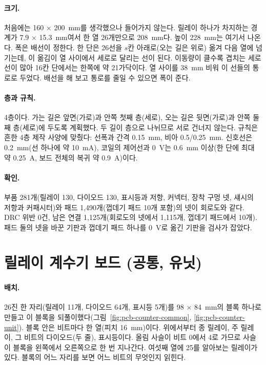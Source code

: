 \paragraph{크기.} 처음에는 160 × 200~mm를 생각했으나 들어가지 않는다. 릴레이 하나가 차지하는 경계가
7.9 × 15.3~mm여서 한 열 26개만으로 208~mm다. 높이 228~mm는 여기서 나온다. 폭은 배선이 정한다. 한 단은 26선을
$s$칸 아래로(오는 길은 위로) 옮겨 다음 열에 넘기는데, 이 옮김이 열 사이에서 세로로 달리는 선이 된다. 이동량이
클수록 겹치는 세로 선이 많아 16칸 단에서는 한쪽에 약 21가닥이다. 열 사이를 38~mm 비워 이 선들의 통로로 두었다.
배선을 해 보고 통로를 줄일 수 있으면 폭이 준다.

\paragraph{층과 규칙.} 4층이다. 가는 길은 앞면(가로)과 안쪽 첫째 층(세로), 오는 길은 뒷면(가로)과 안쪽 둘째
층(세로)에 두도록 계획했다. 두 길이 층으로 나뉘므로 서로 건너지 않는다. 규칙은 흔한 4층 제작 사양에
맞췄다: 선폭과 간격 0.15~mm, 비아 0.5/0.25~mm. 신호선은 0.2~mm(선 하나에 약 10~mA), 코일의 제어선과 0~V는
0.6~mm 이상(한 단에 최대 약 0.25~A, 보드 전체의 복귀 약 0.9~A)이다.

\paragraph{확인.} 부품 281개(릴레이 130, 다이오드 130, 표시등과 저항, 커넥터, 장착 구멍 넷, 섀시의 저항과
커패시터)와 패드 1,490개(껍데기 패드 10개 포함)의 넷이 회로도와 같다. DRC 위반 0건, 남은 연결 1,125개(회로도의
넷에서 1,115개, 껍데기 패드에서 10개). 패드 둘의 넷을 바꾼 기판과 껍데기 패드 하나를 0~V로 옮긴 기판을 검사가 잡았다.


\section{릴레이 계수기 보드 (공통, 유닛)}\label{pcb:counter}

\paragraph{배치.} 26진 한 자리(릴레이 11개, 다이오드 64개, 표시등 5개)를 98 × 84~mm의 블록 하나로 만들고 이
블록을 되풀이했다(그림~\ref{fig:pcb-counter-common}, \ref{fig:pcb-counter-unit}). 블록 안은 비트마다 한 열(피치
16~mm)이다. 위에서부터 종 릴레이, 주 릴레이, 그 비트의 다이오드(두 줄), 표시등이다. 올림 사슬이 비트 0에서 4로
가므로 사슬이 블록을 왼쪽에서 오른쪽으로 한 번 지나간다. 여섯째 열에 25를 알아보는 릴레이가 있다. 블록의
어느 자리를 보면 어느 비트의 무엇인지 읽힌다.

